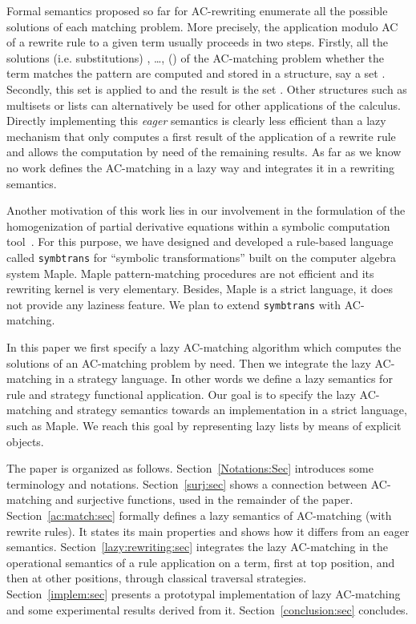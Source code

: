 \documentclass[submission,copyright,creativecommons]{eptcs}
\numberwithin{subcase}{case}
\begin{document}
Formal semantics proposed so far for AC-rewriting enumerate all the possible
solutions of each matching problem. More precisely, the application modulo AC of
a rewrite rule  to a given term  usually proceeds in two steps.
Firstly, all the solutions (i.e. substitutions) , \ldots, 
() of the AC-matching problem whether the term  matches the pattern
 are computed and stored in a structure, say a set
. Secondly, this set is applied to  and the
result is the set . Other structures such
as multisets or lists can alternatively be used for other applications of the
calculus. Directly implementing this \emph{eager} semantics is clearly less
efficient than a lazy mechanism that only computes a first result of the
application of a rewrite rule and allows the computation by need of the remaining
results.  As far
as we know no work defines the AC-matching in a lazy way and integrates it in a
rewriting semantics.


Another motivation of this work lies in our involvement in the formulation of
the homogenization of partial derivative equations within a
 symbolic computation tool~\cite{EuroSim11,CFM11}.
For this purpose, we have designed and developed a rule-based language
 called \texttt{symbtrans} \cite{BGL-JSC10} for ``symbolic transformations''
 built on the computer algebra system Maple. Maple  pattern-matching procedures
 are not efficient and its rewriting kernel is very elementary. Besides, Maple
 is a strict language, it does not provide any laziness feature.
We plan to extend \texttt{symbtrans} with AC-matching.
 

In this paper we first specify a lazy AC-matching algorithm which computes
 the solutions of an AC-matching problem by need.
 Then we integrate the lazy AC-matching in a strategy
language. In other words we define a lazy semantics for rule and strategy
functional application. Our goal is to specify the lazy AC-matching and strategy
 semantics towards an implementation in a strict language, such as
Maple. We reach this goal by  representing  lazy lists by means of explicit
objects.
 


The paper is organized as follows. Section~\ref{Notations:Sec} introduces some
terminology and notations. Section~\ref{surj:sec} shows a connection between
AC-matching and surjective functions, used in the remainder of the paper.
Section~\ref{ac:match:sec} formally defines  a lazy semantics of AC-matching
(with rewrite rules). It states its main properties and shows how it differs
from an eager semantics.
Section~\ref{lazy:rewriting:sec} integrates the lazy AC-matching in the
operational semantics of a rule application on a term, first at top position,
and then at other positions, through classical traversal strategies.
Section~\ref{implem:sec} presents a prototypal implementation of lazy
AC-matching and some experimental results derived from it.
Section~\ref{conclusion:sec} concludes.
\end{document}
